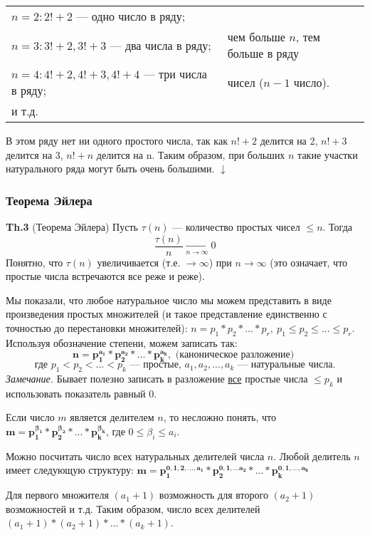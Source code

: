 \documentclass{article}
\begin{document}
  \begin{tabular}{ll}
    \( n = 2: 2! + 2 \) --- одно число в ряду; &\\
    \( n = 3: 3! + 2, 3! + 3 \) --- два числа в ряду; & чем больше \( n \), тем больше в ряду\\
    \( n = 4: 4! + 2, 4! + 3, 4! + 4 \) --- три числа в ряду; & чисел (\( n - 1 \) число).\\
    и т.д. &\\
  \end{tabular}

  В этом ряду нет ни одного простого числа, так как \( n! + 2 \) делится на 2, \( n! + 3 \) делится на 3, \( n! + n \) делится на n. Таким образом, при больших \( n \) такие участки натурального ряда могут быть очень большими. \( \downarrow \) 

  \subsubsection{Теорема Эйлера}
  \textbf{Th.3} (Теорема Эйлера) Пусть \( \tau(n) \) --- количество простых чисел \( \leq n \). Тогда \[ \frac{\tau(n)}{n} \xrightarrow[n \rightarrow \infty]{} 0 \]
  Понятно, что \( \tau(n) \) увеличивается (т.е. \( \rightarrow \infty \)) при \( n \rightarrow \infty \) (это означает, что простые числа встречаются все реже и реже).

  Мы показали, что любое натуральное число мы можем представить в виде произведения простых множителей (и такое представление единственно с точностью до перестановки множителей): \( n = p_1*p_2*...*p_r,\ p_1 \leq p_2 \leq ... \leq p_r \). Используя обозначение степени, можем записать так: \[ \mathbf{n = p_1^{a_1}*p_2^{a_2}*...*p_k^{a_k}}, \textrm{ (каноническое разложение) } \] 
  \[ \textrm{где } p_1 < p_2 < ... < p_k \textrm{ --- простые, } a_1, a_2, ..., a_k \textrm{ --- натуральные числа.} \]
  \textit{Замечание.} Бывает полезно записать в разложение \underline{все} простые числа \( \leq p_k \) и использовать показатель равный 0.

  Если число \( m \) является делителем \( n \), то несложно понять, что \( \mathbf{m = p_1^{\beta_1}*p_2^{\beta_2}*...*p_k^{\beta_k}} \), где \( 0 \leq \beta_i \leq a_i \).

  Можно посчитать число всех натуральных делителей числа \( n \). Любой делитель \( n \) имеет следующую структуру: \( \mathbf{m = p_1^{0,1,2,...,a_1}*p_2^{0,1,...a_2}*...*p_k^{0,1,...,a_k}} \)

  Для первого множителя \( (a_1 + 1) \) возможность для второго \( (a_2 + 1) \) возможностей и т.д. Таким образом, число всех делителей \( (a_1 + 1)*(a_2 + 1)*...*(a_k + 1) \).
\end{document}

